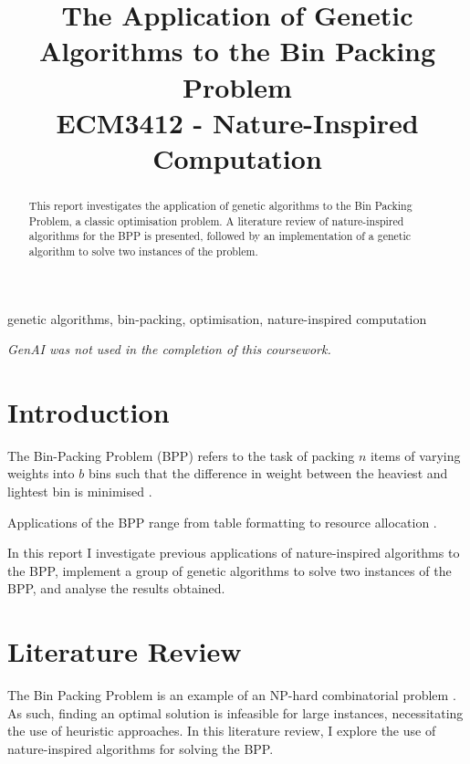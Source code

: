 \documentclass[conference]{IEEEtran}
\begin{document}
\title{
The Application of Genetic Algorithms to the Bin Packing Problem \\
{\footnotesize \textnormal{ECM3412 - Nature-Inspired Computation}}
}

\author{
}

\maketitle

\begin{abstract}
    This report investigates the application of genetic algorithms to the Bin Packing Problem, a classic optimisation problem. A literature review of nature-inspired algorithms for the BPP is presented, followed by an implementation of a genetic algorithm to solve two instances of the problem.
\end{abstract}

\begin{IEEEkeywords}
    genetic algorithms, bin-packing, optimisation, nature-inspired computation
\end{IEEEkeywords}

\textit{GenAI was not used in the completion of this coursework.}

\section{Introduction}
The Bin-Packing Problem (BPP) refers to the task of packing \(n\) items of varying weights into \(b\) bins such that the difference in weight between the heaviest and lightest bin is minimised \cite{delorme2018bpplib}.

Applications of the BPP range from table formatting to resource allocation \cite{johnson1974fast}.

In this report I investigate previous applications of nature-inspired algorithms to the BPP, implement a group of genetic algorithms to solve two instances of the BPP, and analyse the results obtained.

\section{Literature Review}
The Bin Packing Problem is an example of an NP-hard combinatorial problem \cite{dyckhoff1990typology}. As such, finding an optimal solution is infeasible for large instances, necessitating the use of heuristic approaches. In this literature review, I explore the use of nature-inspired algorithms for solving the BPP.
\end{document}
